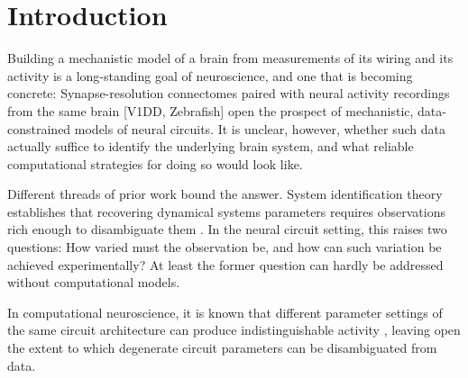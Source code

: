 \documentclass{article}
\begin{document}
\begin{abstract}
Synapse-level connectomes describe the structure of circuits, but not the electrical and chemical dynamics.  Conversely, large-scale recordings of neural activity capture these dynamics, but not the circuit structure.  We asked whether combining binary connectivity and recorded neural activity can be used to infer mechanistic models of neural circuits.  We trained graph neural network models (GNN) to forecast the activity of \emph{Drosophila} visual system simulations.  Trained on activity trajectories in response to visual inputs, the models recover effective connectivity weights, neuron types, and nonlinear activation functions, even when 400\% random connections are added to the given connectivity.  Moreover, they correctly predict causal effects of connection removal, demonstrating the ability to infer mechanistic dependencies directly from activity data.



\end{abstract}


\section{Introduction}

Building a mechanistic model of a brain from measurements of its wiring and its activity is a long-standing goal of neuroscience, and one that is becoming concrete: Synapse-resolution connectomes paired with neural activity recordings from the same brain \citep{MICrONS-Consortium2025-pt} [V1DD, Zebrafish] open the prospect of mechanistic, data-constrained models of neural circuits. It is unclear, however, whether such data actually suffice to identify the underlying brain system, and what reliable computational strategies for doing so would look like.

Different threads of prior work bound the answer. 
System identification theory establishes that recovering dynamical systems parameters requires observations rich enough to disambiguate them \citep{Astrom1965-ri, Ljung2010-by}. In the neural circuit setting, this raises two questions: How varied must the observation be, and how can such variation be achieved experimentally? At least the former question can hardly be addressed without computational models.

In computational neuroscience, it is known that different parameter settings of the same circuit architecture can produce indistinguishable activity \citep{Prinz2004-pb, Marder2011-cc}, leaving open the extent to which degenerate circuit parameters can be disambiguated from data.
\end{document}

